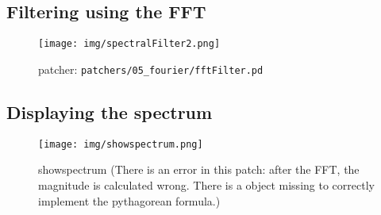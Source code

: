 \subsection{Filtering using the FFT}
\begin{figure}[h]
	\begin{center}
		\texttt{[image: img/spectralFilter2.png]}
		\caption{patcher: \texttt{patchers/05\_fourier/fftFilter.pd}}
		\label{fig:spectralFilter}
	\end{center}
\end{figure}
\subsection{Displaying the spectrum}
\begin{figure}[h]
	\begin{center}
		\texttt{[image: img/showspectrum.png]}
		\caption{showspectrum (There is an error in this patch: after the FFT, the magnitude is calculated wrong. There is a  object missing to correctly implement the pythagorean formula.)}
		\label{fig:showspectrum}
	\end{center}
\end{figure}


